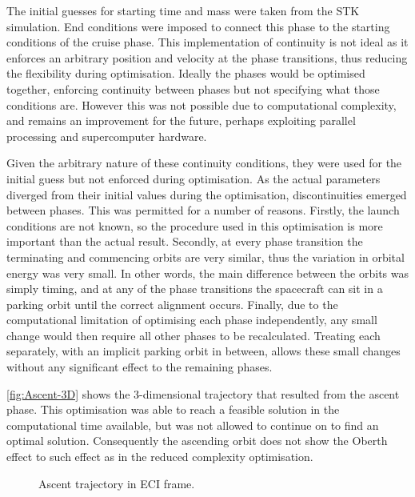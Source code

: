 The initial guesses for starting time and mass were taken from the STK simulation. End conditions were imposed to connect this phase to the starting conditions of the cruise phase. This implementation of continuity is not ideal as it enforces an arbitrary position and velocity at the phase transitions, thus reducing the flexibility during optimisation. Ideally the phases would be optimised together, enforcing continuity between phases but not specifying what those conditions are. However this was not possible due to computational complexity, and remains an improvement for the future, perhaps exploiting parallel processing and supercomputer hardware.

Given the arbitrary nature of these continuity conditions, they were used for the initial guess but not enforced during optimisation. As the actual parameters diverged from their initial values during the optimisation, discontinuities emerged between phases. This was permitted for a number of reasons. Firstly, the launch conditions are not known, so the procedure used in this optimisation is more important than the actual result. Secondly, at every phase transition the terminating and commencing orbits are very similar, thus the variation in orbital energy was very small. In other words, the main difference between the orbits was simply timing, and at any of the phase transitions the spacecraft can sit in a parking orbit until the correct alignment occurs. Finally, due to the computational limitation of optimising each phase independently, any small change would then require all other phases to be recalculated. Treating each separately, with an implicit parking orbit in between, allows these small changes without any significant effect to the remaining phases.

\autoref{fig:Ascent-3D} shows the 3-dimensional trajectory that resulted from the ascent phase. This optimisation was able to reach a feasible solution in the computational time available, but was not allowed to continue on to find an optimal solution. Consequently the ascending orbit does not show the Oberth effect to such effect as in the reduced complexity optimisation.

\begin{figure}
\caption{Ascent trajectory in ECI frame.} \label{fig:Ascent-3D}
\centering
\def\svgwidth{\figurewidth}

\end{figure}

